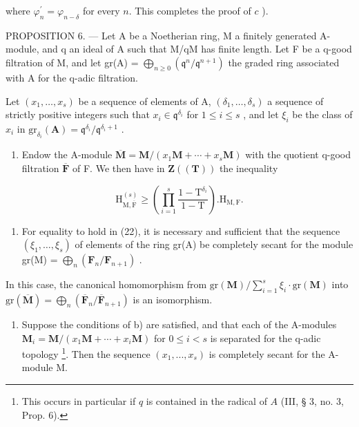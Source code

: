 where \(\varphi_{n}^{\prime} = \varphi_{n - \delta}\) for every \(n\). This completes the proof of \(c\) ).

PROPOSITION 6. — Let A be a Noetherian ring, M a finitely generated A-module, and q an ideal of A such that M/qM has finite length. Let F be a q-good filtration of M, and let gr(A) = \(\bigoplus_{n\geqslant 0}(\mathfrak{q}^n /\mathfrak{q}^{n + 1})\) the graded ring associated with A for the q-adic filtration.

Let \((x_{1},\ldots,x_{s})\) be a sequence of elements of A, \((\delta_{1},\ldots,\delta_{s})\) a sequence of strictly positive integers such that \(x_{i}\in\mathfrak{q}^{\delta_{i}}\) for \(1\leqslant i\leqslant s\) , and let \(\xi_{i}\) be the class of \(x_{i}\) in \(\mathrm{gr}_{\delta_{i}}(\mathbf{A})=\mathfrak{q}^{\delta_{i}}/\mathfrak{q}^{\delta_{i}+1}\) .

\begin{enumerate}
\def\labelenumi{\alph{enumi})}
\tightlist
\item
  Endow the A-module \(\overline{\mathbf{M}} = \mathbf{M}/(x_1\mathbf{M} + \cdots + x_s\mathbf{M})\) with the quotient q-good filtration \(\overline{\mathbf{F}}\) of F. We then have in \(\mathbf{Z}((\mathbf{T}))\) the inequality
\end{enumerate}

\[
\mathrm{H} _ {\mathrm{M}, \overline {{\mathrm{F}}}} ^ {(s)} \geqslant \left(\prod_ {i = 1} ^ {s} \frac {1 - \mathrm{T} ^ {\delta_ {i}}}{1 - \mathrm{T}}\right). \mathrm{H} _ {\mathrm{M}, \mathrm{F}}.\tag{22}
\]

\begin{enumerate}
\def\labelenumi{\alph{enumi})}
\setcounter{enumi}{1}
\tightlist
\item
  For equality to hold in (22), it is necessary and sufficient that the sequence \((\xi_1, \ldots, \xi_s)\) of elements of the ring gr(A) be completely secant for the module gr(M) = \(\bigoplus_{n} (\mathbf{F}_n / \mathbf{F}_{n+1})\) .
\end{enumerate}

In this case, the canonical homomorphism from \(\mathrm{gr}(\mathbf{M}) / \sum_{i=1}^{s} \xi_i \cdot \mathrm{gr}(\mathbf{M})\) into \(\mathrm{gr}(\overline{\mathbf{M}}) = \bigoplus_{n} (\overline{\mathbf{F}}_n / \overline{\mathbf{F}}_{n+1})\) is an isomorphism.

\begin{enumerate}
\def\labelenumi{\alph{enumi})}
\setcounter{enumi}{2}
\tightlist
\item
  Suppose the conditions of b) are satisfied, and that each of the A-modules \(\mathbf{M}_{i} = \mathbf{M}/(x_{1}\mathbf{M} + \cdots + x_{i}\mathbf{M})\) for \(0 \leqslant i < s\) is separated for the q-adic topology \footnote{This occurs in particular if \(q\) is contained in the radical of \(A\) (III, § 3, no. 3, Prop. 6).}. Then the sequence \((x_{1}, ..., x_{s})\) is completely secant for the A-module M.
\end{enumerate}

